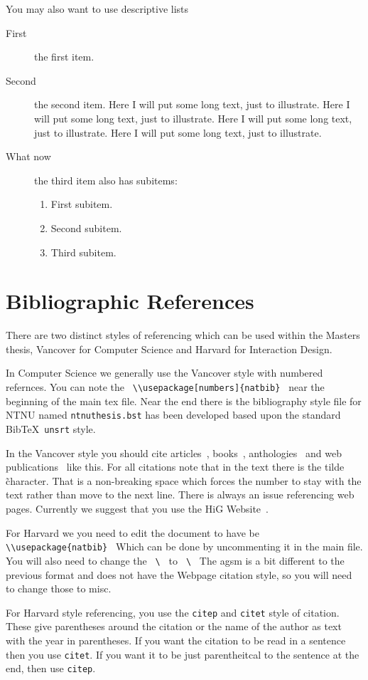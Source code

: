 You may also want to use descriptive lists
\begin{description}
	\item[First] the first item.
	\item[Second] the second item. Here I will put some long text, just to illustrate.
	  Here I will put some long text, just to illustrate. Here I will put
	  some long text, just to illustrate. Here I will put some long text,
	  just to illustrate.
	\item [What now] the third item also has subitems:
	  \begin{enumerate}
		  \item First subitem.
		  \item Second subitem.
		  \item Third subitem.
	  \end{enumerate}
\end{description}


\section{Bibliographic References}

There are two distinct styles of referencing which can be used within the Masters thesis, Vancover for Computer Science and Harvard for Interaction Design.

In Computer Science we generally use the Vancover style with numbered refernces.  
You can note the \verb| \\usepackage[numbers]{natbib} |  near the beginning of the main tex file.
Near the end there is the bibliography style file for NTNU named
\texttt{ntnuthesis.bst} has been developed based upon the
standard Bib\TeX\ \texttt{unsrt} style.
 
In the Vancover style you should cite articles~\cite{Askvall1985}, books~\cite{Card1983},
anthologies~\cite{Lancaster1985} and web publications~\cite{Meldon1997}
like this. For all citations note that in the text there is the tilde \~ character.  
That is a non-breaking space which forces the number to stay with the text rather than move to the next line.
There is always an issue referencing web pages. Currently
we suggest that you use the HiG Website~\cite{HiG:Website}.

For Harvard we you need to edit the document to have be
\verb| \\usepackage{natbib} | Which can be done by uncommenting it in the main file.
You will also need to change the 
\verb| \ | to
\verb| \ |
The agsm is a bit different to the previous format and does not have the Webpage citation style, so you will need to change those to misc.

For Harvard style referencing, you use the \texttt{citep} and \texttt{citet} style of citation. 
These give parentheses around the citation or the name of the author as text with the year in parentheses.  
If you want the citation to be read in a sentence then you use  \texttt{citet}. 
If you want it to be just parentheitcal to the sentence at the end, then use \texttt{citep}.




